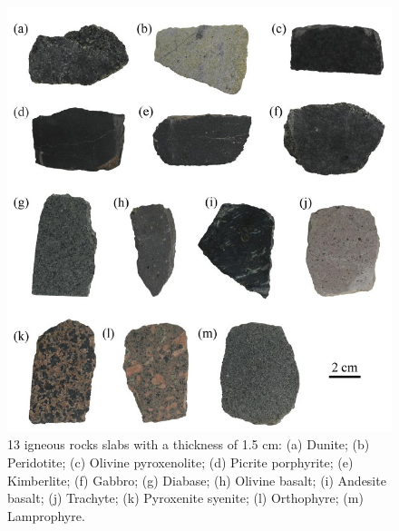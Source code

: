 \begin{figure}[!tb]
    \centering
    \includegraphics[width=0.9\linewidth]{./figures/measurement-literature/rocks-slab.png}
    \caption{13 igneous rocks slabs with a thickness of 1.5 cm: (a) Dunite; (b) Peridotite; (c) Olivine
        pyroxenolite; (d) Picrite porphyrite; (e) Kimberlite; (f) Gabbro; (g) Diabase; (h)
        Olivine basalt; (i) Andesite basalt; (j) Trachyte; (k) Pyroxenite syenite; (l)
        Orthophyre; (m) Lamprophyre.}
    \label{fig:rocks}
\end{figure}

